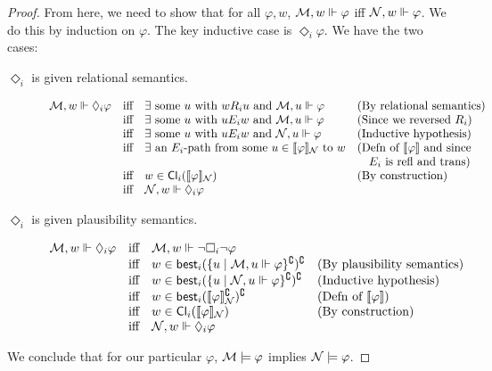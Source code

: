\documentclass[letterpaper]{article}
\begin{document}
\begin{proof}
    From here, we need to show that for all $\varphi, w$, $\mathcal{M}, w \Vdash \varphi$ iff $\mathcal{N}, w \Vdash \varphi$.  We do this by induction on $\varphi$.  The key inductive case is $\Diamond_i \varphi$.  We have the two cases:
    \begin{description}
        \item[$\Diamond_i$ is given relational semantics.] 
        \[
        \begin{array}{lcll}
            \mathcal{M}, w \Vdash \Diamond_i \varphi & \mbox{iff} & \exists \mbox{ some } u \mbox{ with } w{R_i}u \mbox{ and } \mathcal{M}, u \Vdash \varphi & (\mbox{By relational semantics}) \\
            & \mbox{iff} & \exists \mbox{ some } u \mbox{ with } u{E_i}w \mbox{ and } \mathcal{M}, u \Vdash \varphi & (\mbox{Since we reversed } R_i) \\
            & \mbox{iff} & \exists \mbox{ some } u \mbox{ with } u{E_i}w \mbox{ and } \mathcal{N}, u \Vdash \varphi & (\mbox{Inductive hypothesis}) \\
            & \mbox{iff} & \exists \mbox{ an } E_i\mbox{-path from some } u \in [\![\mbox{\em $ \varphi $\/}]\!]_{\mathcal{N}} \mbox{ to } w & (\mbox{Defn of } [\![\mbox{\em $ \varphi $\/}]\!] \mbox{ and since } \\
            & & & \quad E_i \mbox{ is refl and trans}) \\
            & \mbox{iff} & w \in \mathsf{Cl}_i([\![\mbox{\em $ \varphi $\/}]\!]_{\mathcal{N}}) & (\mbox{By construction}) \\
            & \mbox{iff} & \mathcal{N}, w \Vdash \Diamond_i \varphi & 
        \end{array}
        \]
        
        \item[$\Diamond_i$ is given plausibility semantics.]
        \[
        \begin{array}{lcll}
            \mathcal{M}, w \Vdash \Diamond_i \varphi & \mbox{iff} & \mathcal{M}, w \Vdash \neg \Box_i \neg  \varphi & \\
            & \mbox{iff} & w \in \mathsf{best}_i(\{ u \mid \mathcal{M}, u \Vdash \varphi \}^\complement)^\complement & (\mbox{By plausibility semantics}) \\
            & \mbox{iff} & w \in \mathsf{best}_i(\{ u \mid \mathcal{N}, u \Vdash \varphi \}^\complement)^\complement & (\mbox{Inductive hypothesis})\\
            & \mbox{iff} & w \in \mathsf{best}_i([\![\mbox{\em $ \varphi $\/}]\!]_{\mathcal{N}}^\complement)^\complement & (\mbox{Defn of } [\![\mbox{\em $ \varphi $\/}]\!]) \\
            & \mbox{iff} & w \in \mathsf{Cl}_i([\![\mbox{\em $ \varphi $\/}]\!]_{\mathcal{N}}) & (\mbox{By construction}) \\
            & \mbox{iff} & \mathcal{N}, w \Vdash \Diamond_i \varphi & 
        \end{array}
        \]
    \end{description}
    We conclude that for our particular $\varphi$, $\mathcal{M} \models \varphi$ implies $\mathcal{N} \models \varphi$.
\end{proof}
\end{document}
